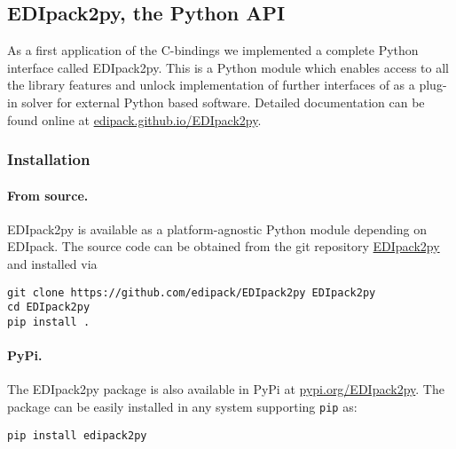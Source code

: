 \documentclass[edipack_sp.tex]{subfiles}
\begin{document}




\subsection{EDIpack2py, the Python API}\label{sSecInteropEDIpy}
As a first application of the \NAME C-bindings we implemented a
complete Python interface called EDIpack2py. This is a Python module which
enables access to all the library features and unlock implementation of
further interfaces of \NAME as a plug-in solver for external Python
based software. Detailed documentation can be found online at \href{https://edipack.github.io/EDIpack2py}
{edipack.github.io/EDIpack2py}.


\subsubsection{Installation}\label{sSecInteropEDIpyInstallation}
\paragraph{From source.}
EDIpack2py is available as a platform-agnostic Python module depending on EDIpack.
The source code can be obtained from the git repository \href{https://github.com/EDIpack/EDIpack2py}{EDIpack2py} and installed via

\begin{lstlisting}[style=mybash]
git clone https://github.com/edipack/EDIpack2py EDIpack2py
cd EDIpack2py
pip install . 
\end{lstlisting}

\paragraph{PyPi.}
The EDIpack2py package is also available in PyPi at
\href{https://pypi.org/project/EDIpack2py/}{pypi.org/EDIpack2py}. The package can be easily installed in any system supporting {\tt pip} as:

\begin{lstlisting}[style=mybash]
pip install edipack2py
\end{lstlisting}

\end{document}
